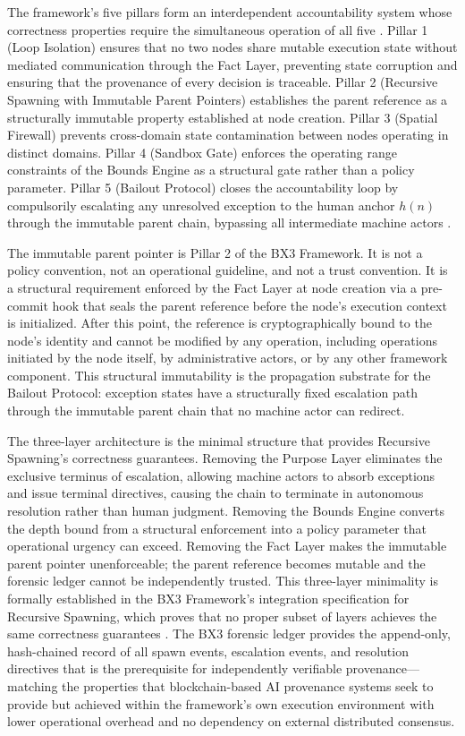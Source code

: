 The framework's five pillars form an interdependent accountability system whose correctness properties require the simultaneous operation of all five \cite{bx3framework}. Pillar 1 (Loop Isolation) ensures that no two nodes share mutable execution state without mediated communication through the Fact Layer, preventing state corruption and ensuring that the provenance of every decision is traceable. Pillar 2 (Recursive Spawning with Immutable Parent Pointers) establishes the parent reference as a structurally immutable property established at node creation. Pillar 3 (Spatial Firewall) prevents cross-domain state contamination between nodes operating in distinct domains. Pillar 4 (Sandbox Gate) enforces the operating range constraints of the Bounds Engine as a structural gate rather than a policy parameter. Pillar 5 (Bailout Protocol) closes the accountability loop by compulsorily escalating any unresolved exception to the human anchor $h(n)$ through the immutable parent chain, bypassing all intermediate machine actors \cite{bx3framework,bailoutprotocol2026}.

The immutable parent pointer is Pillar 2 of the BX3 Framework. It is not a policy convention, not an operational guideline, and not a trust convention. It is a structural requirement enforced by the Fact Layer at node creation via a pre-commit hook that seals the parent reference before the node's execution context is initialized. After this point, the reference is cryptographically bound to the node's identity and cannot be modified by any operation, including operations initiated by the node itself, by administrative actors, or by any other framework component. This structural immutability is the propagation substrate for the Bailout Protocol: exception states have a structurally fixed escalation path through the immutable parent chain that no machine actor can redirect.

The three-layer architecture is the minimal structure that provides Recursive Spawning's correctness guarantees. Removing the Purpose Layer eliminates the exclusive terminus of escalation, allowing machine actors to absorb exceptions and issue terminal directives, causing the chain to terminate in autonomous resolution rather than human judgment. Removing the Bounds Engine converts the depth bound from a structural enforcement into a policy parameter that operational urgency can exceed. Removing the Fact Layer makes the immutable parent pointer unenforceable; the parent reference becomes mutable and the forensic ledger cannot be independently trusted. This three-layer minimality is formally established in the BX3 Framework's integration specification for Recursive Spawning, which proves that no proper subset of layers achieves the same correctness guarantees \cite{bx3framework}. The BX3 forensic ledger provides the append-only, hash-chained record of all spawn events, escalation events, and resolution directives that is the prerequisite for independently verifiable provenance---matching the properties that blockchain-based AI provenance systems seek to provide \cite{on_chain_provenance_ai} but achieved within the framework's own execution environment with lower operational overhead and no dependency on external distributed consensus.
